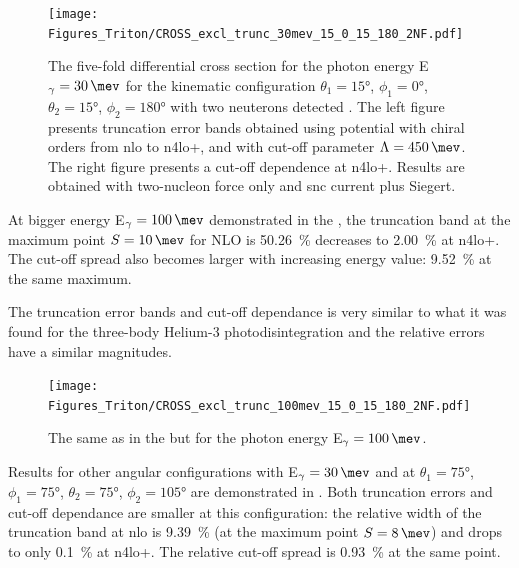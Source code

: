     \begin{figure}[h]
        \begin{center}
            \texttt{[image: Figures\_Triton/CROSS\_excl\_trunc\_30mev\_15\_0\_15\_180\_2NF.pdf]}
            \end{center}
            \caption{The five-fold differential cross section for the photon 
            energy E$_\gamma=\SI{30}{\mev}$ for the kinematic configuration
            $\theta_1 = \ang{15}$, $\phi_1 = \ang{0}$,
            $\theta_2 = \ang{15}$, $\phi_2 = \ang{180}$ with two neuterons detected .
            The left figure presents truncation error bands obtained using potential
            with chiral orders from \gls{nlo} to \gls{n4lo+}, and with
            cut-off parameter $\Lambda=\SI{450}{\mev}$.
            The right figure presents a cut-off dependence at \gls{n4lo+}.
            Results are obtained with two-nucleon force only and \gls{snc} current plus Siegert.}
            \label{CROSS_Triton_EXCL_30_15_0_15_180}
    \end{figure}

    At bigger energy E$_\gamma=\SI{100}{\mev}$ demonstrated in the ,
    the truncation band at the maximum point $S=\SI{10}{\mev}$ for NLO is \SI{50.26}{\percent}
    decreases to \SI{2.00}{\percent} at \gls{n4lo+}.
    The cut-off spread also becomes larger with increasing energy value: \SI{9.52}{\percent}
    at the same maximum.

    The truncation error bands and cut-off dependance is very similar to what it was found for
    the three-body Helium-3 photodisintegration and the relative errors 
    have a similar magnitudes.

    \begin{figure}[h]
        \begin{center}
            \texttt{[image: Figures\_Triton/CROSS\_excl\_trunc\_100mev\_15\_0\_15\_180\_2NF.pdf]}
            \end{center}
            \caption{The same as in the  but for the photon energy
            E$_\gamma = \SI{100}{\mev}$.}
            \label{CROSS_Triton_EXCL_100mev_15_0_15_180}
    \end{figure}



    Results for other angular configurations with E$_\gamma=\SI{30}{\mev}$ and at 
    $\theta_1 = \ang{75}$, $\phi_1 = \ang{75}$,
    $\theta_2 = \ang{75}$, $\phi_2 = \ang{105}$ are
    demonstrated in .
    Both truncation errors and cut-off dependance are smaller at this configuration:
    the relative  width of the truncation band at \gls{nlo} is \SI{9.39}{\percent}
    (at the maximum point $S=\SI{8}{\mev}$) and drops to only \SI{0.1}{\percent}
    at \gls{n4lo+}. The relative cut-off spread is \SI{0.93}{\percent} at the same point.

